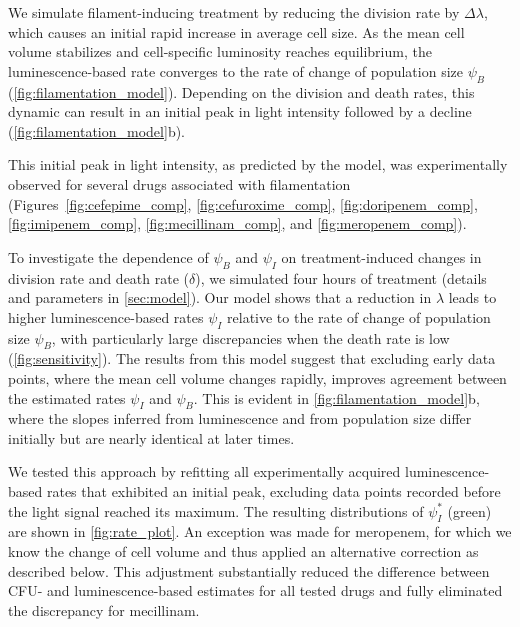 We simulate filament-inducing treatment by reducing the division rate by $\Delta \lambda$, which causes an initial rapid increase in average cell size.
As the mean cell volume stabilizes and cell-specific luminosity reaches equilibrium, the luminescence-based rate converges to the rate of change of population size $\psi_B$ (\autoref{fig:filamentation_model}).
Depending on the division and death rates, this dynamic can result in an initial peak in light intensity followed by a decline (\autoref{fig:filamentation_model}b).

This initial peak in light intensity, as predicted by the model, was experimentally observed for several drugs associated with filamentation (Figures~\ref{fig:cefepime_comp}, \ref{fig:cefuroxime_comp}, \ref{fig:doripenem_comp}, \ref{fig:imipenem_comp}, \ref{fig:mecillinam_comp}, and \ref{fig:meropenem_comp}).

To investigate the dependence of \(\psi_B\) and \(\psi_I\) on treatment-induced changes in division rate and death rate (\(\delta\)), we simulated four hours of treatment (details and parameters in \autoref{sec:model}).
Our model shows that a reduction in $\lambda$ leads to higher luminescence-based rates $\psi_I$ relative to the rate of change of population size $\psi_B$, with particularly large discrepancies when the death rate is low (\autoref{fig:sensitivity}).
The results from this model suggest that excluding early data points, where the mean cell volume changes rapidly, improves agreement between the estimated rates \(\psi_I\) and \(\psi_B\).
This is evident in \autoref{fig:filamentation_model}b, where the slopes inferred from luminescence and from population size differ initially but are nearly identical at later times.

We tested this approach by refitting all experimentally acquired luminescence-based rates that exhibited an initial peak, excluding data points recorded before the light signal reached its maximum.
The resulting distributions of $\psi_I^*$ (green) are shown in \autoref{fig:rate_plot}.
An exception was made for meropenem, for which we know the change of cell volume and thus applied an alternative correction as described below.
This adjustment substantially reduced the difference between CFU- and luminescence-based estimates for all tested drugs and fully eliminated the discrepancy for mecillinam.


